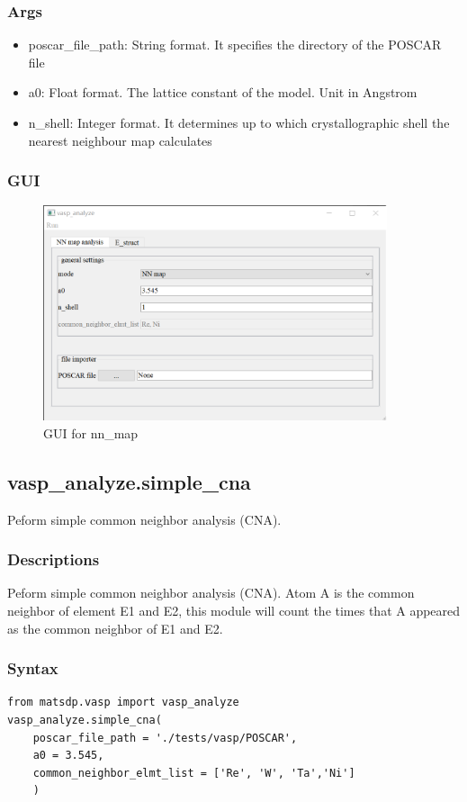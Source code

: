 \documentclass[12pt]{book}
\begin{document}
\subsubsection{Args}
\begin{itemize}
\item poscar\_file\_path: String format. It specifies the directory of the POSCAR file
\item a0: Float format. The lattice constant of the model. Unit in Angstrom
\item n\_shell: Integer format. It determines up to which crystallographic shell the nearest neighbour map calculates
 \end{itemize}

\subsubsection{GUI}
\begin{figure}[htbp]
\centering
\includegraphics[width=0.9\textwidth]{gui_nn_map.pdf}
\caption{GUI for nn\_map}
\label{fig:GUI_NN_map}
\end{figure}

\subsection{vasp\_analyze.simple\_cna}
Peform simple common neighbor analysis (CNA).

\subsubsection{Descriptions}
Peform simple common neighbor analysis (CNA). Atom A is the common neighbor of element E1 and E2, this module will count the times that A appeared as the common neighbor of E1 and E2.
\subsubsection{Syntax}
\begin{lstlisting}
from matsdp.vasp import vasp_analyze
vasp_analyze.simple_cna(
    poscar_file_path = './tests/vasp/POSCAR',
    a0 = 3.545,
    common_neighbor_elmt_list = ['Re', 'W', 'Ta','Ni']
    )
\end{lstlisting}
\end{document}
